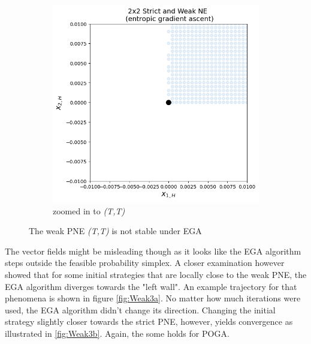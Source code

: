 \begin{figure}[H]
\begin{subfigure}{.52\textwidth}
    \includegraphics[width=\textwidth]{logos/Weak4.png}
    \caption{zoomed in to \textit{(T,T)}}
    \label{fig:Weak2b}
\end{subfigure}
\caption{The weak PNE \textit{(T,T)} is not stable under EGA}
\label{fig:2x2Weak2}
\end{figure}

The vector fields might be misleading though as it looks like the EGA algorithm steps outside the feasible probability simplex. A closer examination however showed that for some initial strategies that are locally close to the weak PNE, the EGA algorithm diverges towards the "left wall". An example trajectory for that phenomena is shown in figure \ref{fig:Weak3a}. No matter how much iterations were used, the EGA algorithm didn't change its direction. Changing the initial strategy slightly closer towards the strict PNE, however, yields convergence as illustrated in \ref{fig:Weak3b}. Again, the some holds for POGA.

